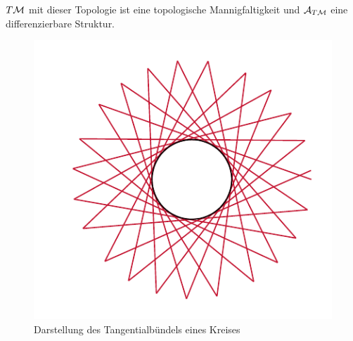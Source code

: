 \begin{satz}
$T\mathcal{M}$ mit dieser Topologie ist eine topologische Mannigfaltigkeit und $\mathcal{A}_{T\mathcal{M}}$ eine differenzierbare Struktur.
\end{satz}

\begin{figure}[H]
\centering
\includegraphics[scale=0.7]{figures/tikz/tangent_bundle.pdf}
\caption{Darstellung des Tangentialbündels eines Kreises}
\label{img:tangent_bundle}
\end{figure}
